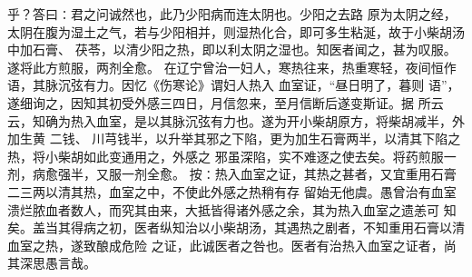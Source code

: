 \documentclass[a4paper,12pt,UTF8,twoside]{ctexbook}
\begin{document}
乎？答曰∶君之问诚然也，此乃少阳病而连太阴也。少阳之去路 
原为太阴之经，太阴在腹为湿土之气，若与少阳相并，则湿热化合，即可多生粘涎，故于小柴胡汤中加石膏、 
茯苓，以清少阳之热，即以利太阴之湿也。知医者闻之，甚为叹服。遂将此方煎服，两剂全愈。 
在辽宁曾治一妇人，寒热往来，热重寒轻，夜间恒作 语，其脉沉弦有力。因忆《伤寒论》谓妇人热入 
血室证，“昼日明了，暮则 语”，遂细询之，因知其初受外感三四日，月信忽来，至月信断后遂变斯证。据 
所云云，知确为热入血室，是以其脉沉弦有力也。遂为开小柴胡原方，将柴胡减半，外加生黄 二钱、 
川芎钱半，以升举其邪之下陷，更为加生石膏两半，以清其下陷之热，将小柴胡如此变通用之，外感之 
邪虽深陷，实不难逐之使去矣。将药煎服一剂，病愈强半，又服一剂全愈。 
按∶热入血室之证，其热之甚者，又宜重用石膏二三两以清其热，血室之中，不使此外感之热稍有存 
留始无他虞。愚曾治有血室溃烂脓血者数人，而究其由来，大抵皆得诸外感之余，其为热入血室之遗恙可 
知矣。盖当其得病之初，医者纵知治以小柴胡汤，其遇热之剧者，不知重用石膏以清血室之热，遂致酿成危险 
之证，此诚医者之咎也。医者有治热入血室之证者，尚其深思愚言哉。 
\end{document}

